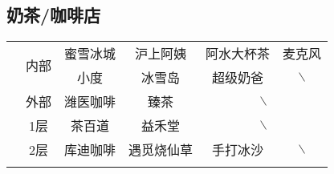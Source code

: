 \subsection[奶茶/咖啡店]{奶茶/咖啡店}
\begin{table}[H]
    \centering
    \begin{tabular}{|c|c|c|c|c|c|}
        \Xhline{1.2pt}
        \multirow{3}{*}{食堂} & \multirow{2}{*}{内部}               & 蜜雪冰城         & 沪上阿姨  %
                            & 阿水大杯茶                             & 麦克风                  \\
        \cline{3-6}
                            &                                   & 小度           & 冰雪岛   %
                            & 超级奶爸                              & $\backslash$         \\
        \cline{2-6}
                            & 外部                                & 潍医咖啡         & 臻茶    %
                            & \multicolumn{2}{c|}{$\backslash$}                        \\
        \Xhline{1.2pt}
        \multirow{2}{*}{大服} & 1层                                & 茶百道          & 益禾堂   %
                            & \multicolumn{2}{c|}{$\backslash$}                        \\
        \cline{2-6}
                            & 2层                                & 库迪咖啡         & 遇觅烧仙草 %
                            & 手打冰沙                              & $\backslash$         \\
        \Xhline{1.2pt}
    \end{tabular}
\end{table}

